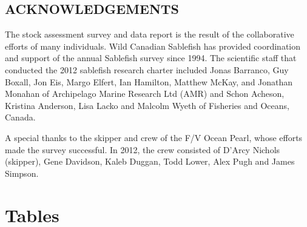 \documentclass[12pt]{article}\usepackage[]{graphicx}\usepackage[]{color}
\begin{document}
\hypertarget{acknowledgements}{%
\subsection{ACKNOWLEDGEMENTS}\label{acknowledgements}}

The stock assessment survey and data report is the result of the collaborative efforts of many individuals. Wild Canadian Sablefish has provided coordination and support of the annual Sablefish survey since 1994. The scientific staff that conducted the 2012 sablefish research charter included Jonas Barranco, Guy Boxall, Jon Eis, Margo Elfert, Ian Hamilton, Matthew McKay, and Jonathan Monahan of Archipelago Marine Research Ltd (AMR) and Schon Acheson, Kristina Anderson, Lisa Lacko and Malcolm Wyeth of Fisheries and Oceans, Canada.

A special thanks to the skipper and crew of the F/V Ocean Pearl, whose efforts made the survey successful. In 2012, the crew consisted of D'Arcy Nichols (skipper), Gene Davidson, Kaleb Duggan, Todd Lower, Alex Pugh and James Simpson.

\clearpage

\hypertarget{tables}{%
\section{Tables}\label{tables}}
\end{document}

